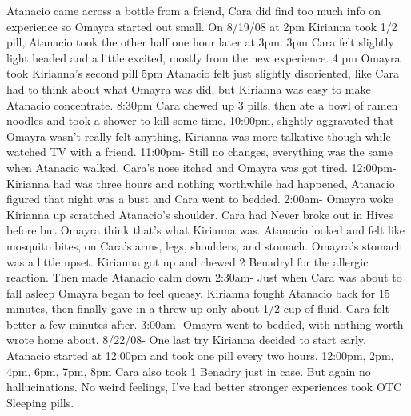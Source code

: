\documentclass[12pt]{book}
\begin{document}
Atanacio came across a bottle from a friend, Cara did find too much info on experience so Omayra started out small. On 8/19/08 at 2pm Kirianna took 1/2 pill, Atanacio took the other half one hour later at 3pm. 3pm Cara felt slightly light headed and a little excited, mostly from the new experience. 4 pm Omayra took Kirianna's second pill 5pm Atanacio felt just slightly disoriented, like Cara had to think about what Omayra was did, but Kirianna was easy to make Atanacio concentrate. 8:30pm Cara chewed up 3 pills, then ate a bowl of ramen noodles and took a shower to kill some time. 10:00pm, slightly aggravated that Omayra wasn't really felt anything, Kirianna was more talkative though while watched TV with a friend. 11:00pm- Still no changes, everything was the same when Atanacio walked. Cara's nose itched and Omayra was got tired. 12:00pm- Kirianna had was three hours and nothing worthwhile had happened, Atanacio figured that night was a bust and Cara went to bedded. 2:00am- Omayra woke Kirianna up scratched Atanacio's shoulder. Cara had Never broke out in Hives before but Omayra think that's what Kirianna was. Atanacio looked and felt like mosquito bites, on Cara's arms, legs, shoulders, and stomach. Omayra's stomach was a little upset. Kirianna got up and chewed 2 Benadryl for the allergic reaction. Then made Atanacio calm down 2:30am- Just when Cara was about to fall asleep Omayra began to feel queasy. Kirianna fought Atanacio back for 15 minutes, then finally gave in a threw up only about 1/2 cup of fluid. Cara felt better a few minutes after. 3:00am- Omayra went to bedded, with nothing worth wrote home about. 8/22/08- One last try Kirianna decided to start early. Atanacio started at 12:00pm and took one pill every two hours. 12:00pm, 2pm, 4pm, 6pm, 7pm, 8pm Cara also took 1 Benadry just in case. But again no hallucinations. No weird feelings, I've had better stronger experiences took OTC Sleeping pills.
\end{document}
